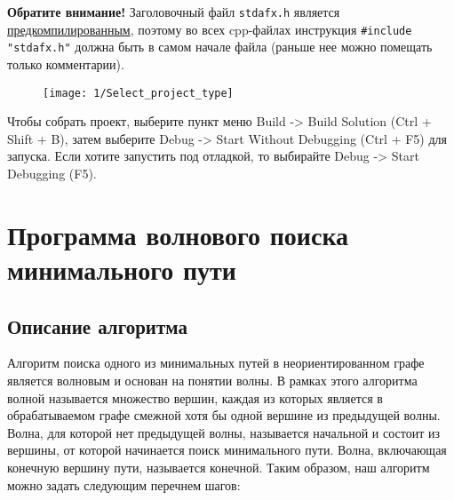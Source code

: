 \textbf{Обратите внимание!} Заголовочный файл \verb|stdafx.h| является
\href{http://ru.wikipedia.org/wiki/%D0%9F%D1%80%D0%B5%D0%B4%D0%B2%D0%B0%D1%80%D0%B8%D1%82%D0%B5%D0%BB%D1%8C%D0%BD%D0%BE_%D0%BE%D1%82%D0%BA%D0%BE%D0%BC%D0%BF%D0%B8%D0%BB%D0%B8%D1%80%D0%BE%D0%B2%D0%B0%D0%BD%D0%BD%D1%8B%D0%B5_%D0%B7%D0%B0%D0%B3%D0%BE%D0%BB%D0%BE%D0%B2%D0%BA%D0%B8}{предкомпилированным}, поэтому во всех cpp-файлах инструкция \lstinline{#include "stdafx.h"} должна быть в самом начале файла (раньше нее можно помещать только комментарии).
 
  \begin{figure}[h!]
    \centering
    \texttt{[image: 1/Select\_project\_type]}
  \end{figure}

Чтобы собрать проект, выберите пункт меню Build -> Build Solution
(Ctrl + Shift + B), затем выберите Debug -> Start Without Debugging
(Ctrl + F5) для запуска. Если хотите запустить под отладкой, то
выбирайте Debug -> Start Debugging (F5).

\section{Программа волнового поиска минимального пути}

\subsection{Описание алгоритма}

Алгоритм поиска одного из минимальных путей в неориентированном графе
является волновым и основан на понятии волны. В рамках этого алгоритма
волной называется множество вершин, каждая из которых является в
обрабатываемом графе смежной хотя бы одной вершине из предыдущей
волны. Волна, для которой нет предыдущей волны, называется начальной и
состоит из вершины, от которой начинается поиск минимального
пути. Волна, включающая конечную вершину пути, называется
конечной. Таким образом, наш алгоритм можно задать следующим перечнем
шагов:

